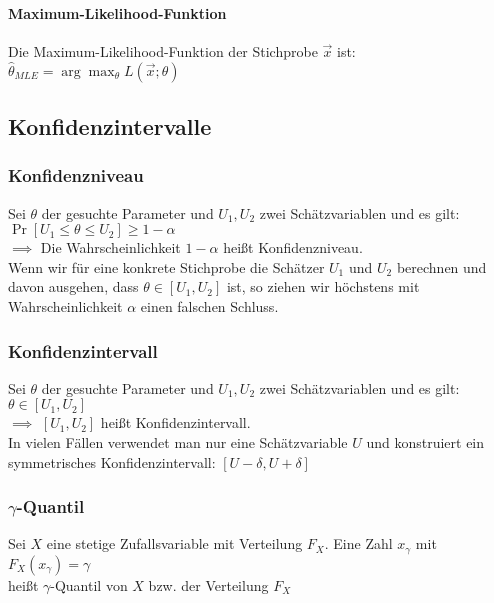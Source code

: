 \documentclass[a4paper,9pt]{extarticle}
\begin{document}
\paragraph*{Maximum-Likelihood-Funktion}
Die Maximum-Likelihood-Funktion der Stichprobe $\vec x$ ist: \\
$\hat{\theta}_{MLE} = \arg \max_{\theta} L(\vec{x}; \theta)$

\subsection*{Konfidenzintervalle}
\subsubsection*{Konfidenzniveau}
Sei $\theta$ der gesuchte Parameter und $U_1, U_2$ zwei Schätzvariablen und es gilt: \\
$\Pr[U_1 ≤ \theta ≤ U_2] ≥ 1 - \alpha$ \\
$\implies$ Die Wahrscheinlichkeit $1 - \alpha$ heißt Konfidenzniveau. \\

Wenn wir für eine konkrete Stichprobe die Schätzer $U_1$ und $U_2$ berechnen und davon ausgehen, dass $\theta \in [U_1, U_2]$ ist, so ziehen wir höchstens mit Wahrscheinlichkeit $\alpha$ einen falschen Schluss.

\subsubsection*{Konfidenzintervall}
Sei $\theta$ der gesuchte Parameter und $U_1, U_2$ zwei Schätzvariablen und es gilt: \\
$\theta \in [U_1, U_2]$ \\
$\implies$ $[U_1, U_2]$ heißt Konfidenzintervall. \\

In vielen Fällen verwendet man nur eine Schätzvariable $U$ und konstruiert ein symmetrisches Konfidenzintervall:
$[U - \delta, U + \delta]$

\subsubsection*{$\gamma$-Quantil}
Sei $X$ eine stetige Zufallsvariable mit Verteilung $F_X$. Eine Zahl $x_{\gamma}$ mit
$F_X(x_{\gamma}) = \gamma$ \\
heißt $\gamma$-Quantil von $X$ bzw. der Verteilung $F_X$ \\
\end{document}
